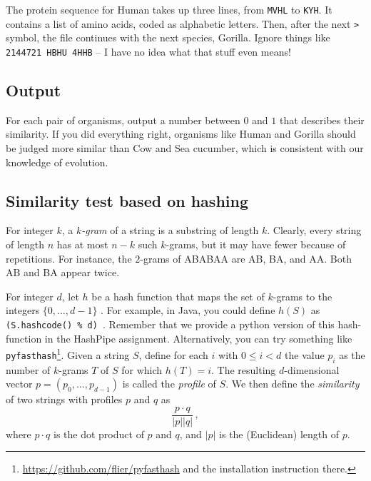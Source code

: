 \documentclass{tufte-handout}
\begin{document}
The protein sequence for Human takes up three lines, from {\tt MVHL} to {\tt KYH}.
It contains a list of amino acids, coded as alphabetic letters.
Then, after the next {\tt >} symbol, the file continues with the next species, Gorilla.
Ignore things like {\tt 2144721 HBHU 4HHB} -- I have no idea what that stuff even means!

\subsection{Output}

For each pair of organisms, output a number between $0$ and $1$ that describes their similarity.
If you did everything right, organisms like Human and Gorilla should be judged more similar than Cow and Sea cucumber, which is consistent with our knowledge of evolution.


\subsection{Similarity test based on hashing}

For integer $k$, a \emph{$k$-gram} of a string is a substring of length $k$.
Clearly, every string of length $n$ has at most $n-k$ such $k$-grams, but it may have fewer because of repetitions.
For instance, the $2$-grams of ABABAA are AB, BA, and AA.
Both AB and BA appear twice.

For integer $d$, let $h$ be a hash function that maps the set of $k$-grams to the integers $\{0,\ldots,d-1\}$ .
For example, in Java, you could define $h(S)$ as
{\tt (S.hashcode() \% d) }.
Remember that we provide a python version of this hash-function in the HashPipe assignment. 
Alternatively, you can try something like \texttt{pyfasthash}\footnote{\url{https://github.com/flier/pyfasthash} and the installation instruction there.}.
Given a string $S$, define for each $i$ with $0\leq i< d$ the value $p_i$ as the number of $k$-grams $T$ of $S$ for which $h(T) = i$.
The resulting $d$-dimensional vector $p=(p_0,\ldots,p_{d-1})$ is called the \emph{profile} of $S$.
We then define the \emph{similarity} of two strings with profiles $p$ and $q$ as
\[
    \frac{p\cdot q}{\left|p\right| \left|q\right|}\,,
\]
where $p\cdot q$ is the dot product
of $p$ and $q$, and $|p|$ is the (Euclidean) length of $p$.
\end{document}
